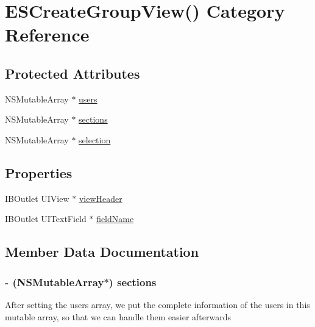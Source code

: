 \hypertarget{category_e_s_create_group_view_07_08}{}\section{E\+S\+Create\+Group\+View() Category Reference}
\label{category_e_s_create_group_view_07_08}
\subsection*{Protected Attributes}
\begin{DoxyCompactItemize}
\item 
N\+S\+Mutable\+Array $\ast$ \hyperlink{category_e_s_create_group_view_07_08_ab5b2d4b5e01d6ec9eb5c8ba47c0c7bde}{users}
\item 
N\+S\+Mutable\+Array $\ast$ \hyperlink{category_e_s_create_group_view_07_08_a5bdb452e351f91125f406d1024907b65}{sections}
\item 
N\+S\+Mutable\+Array $\ast$ \hyperlink{category_e_s_create_group_view_07_08_a753085d28703847d583393825fff377c}{selection}
\end{DoxyCompactItemize}
\subsection*{Properties}
\begin{DoxyCompactItemize}
\item 
I\+B\+Outlet U\+I\+View $\ast$ \hyperlink{category_e_s_create_group_view_07_08_aec7f8c0eb97bf847f327282bfed6fab1}{view\+Header}
\item 
I\+B\+Outlet U\+I\+Text\+Field $\ast$ \hyperlink{category_e_s_create_group_view_07_08_a6d8453bf6a0d7db8c503400f60cbad6a}{field\+Name}
\end{DoxyCompactItemize}


\subsection{Member Data Documentation}
\hypertarget{category_e_s_create_group_view_07_08_a5bdb452e351f91125f406d1024907b65}{}
\subsubsection[{sections}]{\setlength{\rightskip}{0pt plus 5cm}-\/ (N\+S\+Mutable\+Array$\ast$) sections\hspace{0.3cm}{\ttfamily [protected]}}\label{category_e_s_create_group_view_07_08_a5bdb452e351f91125f406d1024907b65}
After setting the users array, we put the complete information of the users in this mutable array, so that we can handle them easier afterwards \hypertarget{category_e_s_create_group_view_07_08_a753085d28703847d583393825fff377c}{}
